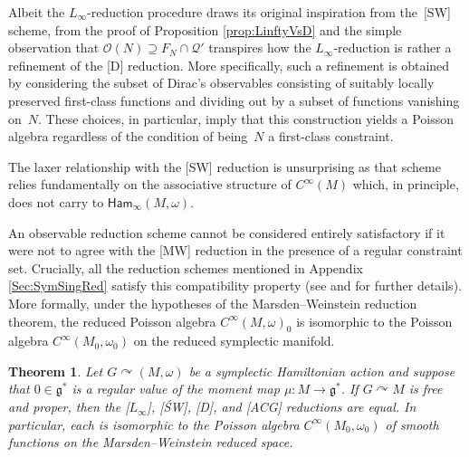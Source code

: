 \documentclass[10pt,a4paper]{amsart}
\numberwithin{equation}{section}
\newtheorem{Theorem}{Theorem}[section]
\DeclareMathOperator{\action}{\curvearrowright}
\newcommand{\g}{\mathfrak{g}}
\newcommand{\Ham}{\mathsf{Ham}}
\renewcommand{\supset}{\supseteq}
\begin{document}
\begin{Remark}
Albeit the $L_\infty$-reduction procedure draws its original inspiration from the~[SW] scheme, from the proof of Proposition \ref{prop:LinftyVsD} and the simple observation that $\mathcal{O}(N)\supset F_N\cap\mathcal{Q}'$ transpires how the $L_\infty$-reduction is rather a refinement of the [D] reduction.
More specifically, such a refinement is obtained by considering the subset of Dirac's observables consisting of suitably locally preserved first-class functions and dividing out by a subset of functions vanishing on~$N$. These choices, in particular, imply that this construction yields a Poisson algebra regardless of the condition of being~$N$ a first-class constraint.

The laxer relationship with the [SW] reduction is unsurprising as that scheme relies fundamentally on the associative structure of $C^\infty(M)$ which, in principle, does not carry to $\Ham_\infty(M,\omega)$.
\end{Remark}

An observable reduction scheme cannot be considered entirely satisfactory if it were not to agree with the [MW] reduction in the presence of a regular constraint set.
Crucially, all the reduction schemes mentioned in Appendix \ref{Sec:SymSingRed} satisfy this compatibility property (see \cite[Theorem~1]{SniatyckiWeinstein83} and \cite[Proposition~3.6]{ArmsGotayJennings90} for further details).
%
More formally, under the hypotheses of the Marsden--Weinstein reduction theorem, the reduced Poisson algebra $C^\infty(M,\omega)_0$ is isomorphic to the Poisson algebra $C^\infty(M_0,\omega_0)$ on the reduced symplectic manifold.

\begin{Theorem}\label{thm:AllReductionsComparison-sympleticcase}
	Let $G\action (M,\omega)$ be a symplectic Hamiltonian action and suppose that $0\in\g^*$ is a regular value of the moment map $\mu\colon M\to\g^*$.
	If $G\curvearrowright M$ is free and proper, then the {\rm [$L_\infty$]}, {\rm [\'SW]}, {\rm [D]}, and {\rm [ACG]} reductions are equal.
	In particular, each is isomorphic to the Poisson algebra $C^\infty(M_0,\omega_0)$ of smooth functions on the Marsden--Weinstein reduced space.
\end{Theorem}
\end{document}
